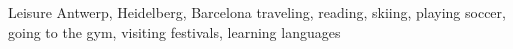 \documentclass[]{friggeri-cv}
\begin{document}
\begin{entrylist}
  \entry
    {}
    {Leisure}
    {Antwerp, Heidelberg, Barcelona}
    {traveling, reading, skiing, playing soccer, going to the gym, visiting festivals, learning languages}
\end{entrylist}






\end{document}
